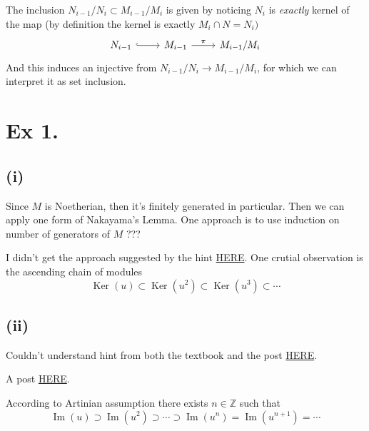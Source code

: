 The inclusion $N_{i-1}/N_i\subset M_{i-1}/M_i$ is given by noticing $N_i$ is \textit{exactly} kernel of the map (by definition the kernel is exactly $M_i\cap N=N_{i})$
\[\begin{tikzcd}
	{N_{i-1}} & {M_{i-1}} & {M_{i-1}/M_i}
	\arrow[hook, from=1-1, to=1-2]
	\arrow["\pi", from=1-2, to=1-3]
\end{tikzcd}\]
And this induces an injective from $N_{i-1}/N_i\to M_{i-1}/M_i$, for which we can interpret it as set inclusion.

\section{Ex 1.}\label{Atiyah Chapter 6 Ex 1.}

\subsection{(i)}

Since $M$ is Noetherian, then it's finitely generated in particular. 
Then we can apply one form of Nakayama's Lemma.
One approach is to use induction on number of generators of $M$ ??? 

I didn't get the approach suggested by the hint \href{https://math.stackexchange.com/questions/145310/proving-that-surjective-endomorphisms-of-noetherian-modules-are-isomorphisms-and}{HERE}.
One crutial observation is the ascending chain of modules
$$\operatorname{Ker}(u)\subset\operatorname{Ker}(u^2)\subset\operatorname{Ker}(u^3)\subset\cdots$$

\subsection{(ii)}

Couldn't understand hint from both the textbook and the post \href{https://math.stackexchange.com/questions/145310/proving-that-surjective-endomorphisms-of-noetherian-modules-are-isomorphisms-and}{HERE}. 

A post \href{https://math.stackexchange.com/questions/273181/if-m-is-an-artinian-module-and-f-m-to-m-is-an-injective-homomorphism-then}{HERE}.

According to Artinian assumption there exists $n\in \mathbb Z$ such that 
$$\operatorname{Im}(u)\supset\operatorname{Im}(u^2)\supset\cdots\supset \operatorname{Im}(u^n)=\operatorname{Im}(u^{n+1})=\cdots$$

